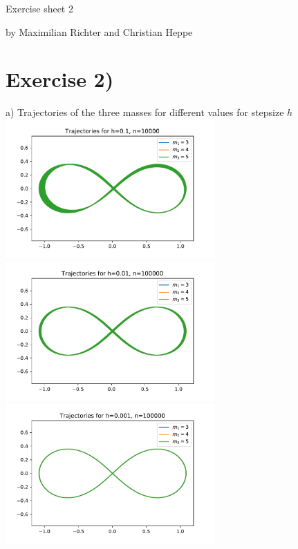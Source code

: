 \documentclass[12pt,a4paper]{article}
\begin{document}
\centerline{\large Exercise sheet 2}\vspace{0.5em}
\centerline{\large by Maximilian Richter and Christian Heppe}\vspace{1em}

\section*{Exercise 2)}

a) Trajectories of the three masses for different values for stepsize $h$\\
\includegraphics[width=8cm]{a_h_1.pdf}
\includegraphics[width=8cm]{a_h_01.pdf}\\
\includegraphics[width=8cm]{a_h_001.pdf}
\end{document}
